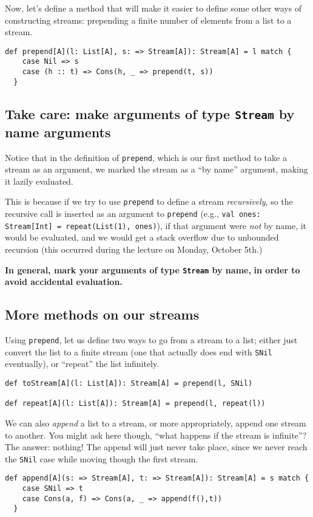 \documentclass[11pt]{article}
\begin{document}
Now, let's define a method that will make it easier
to define some other ways of constructing streams:
prepending a finite number of elements from a list
to a stream.
\begin{verbatim}
def prepend[A](l: List[A], s: => Stream[A]): Stream[A] = l match {
    case Nil => s
    case (h :: t) => Cons(h, _ => prepend(t, s))
  }
\end{verbatim}

\subsection{Take care: \textbf{make arguments of type \texttt{Stream} by name arguments}}
\label{sec:orgfa81477}
Notice that in the definition of \texttt{prepend},
which is our first method to take a stream as an argument,
we marked the stream as a “by name” argument,
making it lazily evaluated.

This is because if we try to
use \texttt{prepend} to define a stream \emph{recursively},
so the recursive call is inserted as an argument
to \texttt{prepend} (e.g., \texttt{val ones: Stream[Int] = repeat(List(1), ones)}),
if that argument were \emph{not} by name, it would be evaluated,
and we would get a stack overflow due to unbounded recursion
(this occurred during the lecture on Monday, October 5th.)

\begin{center}
\textbf{In general, mark your arguments of type \texttt{Stream} by name,}
\textbf{in order to avoid accidental evaluation.}
\end{center}

\subsection{More methods on our streams}
\label{sec:orge6d26f3}
Using \texttt{prepend}, let us define two ways
to go from a stream to a list;
either just convert the list to a finite stream
(one that actually does end with \texttt{SNil} eventually),
or “repeat” the list infinitely.
\begin{verbatim}
def toStream[A](l: List[A]): Stream[A] = prepend(l, SNil)

def repeat[A](l: List[A]): Stream[A] = prepend(l, repeat(l))
\end{verbatim}

We can also \emph{append} a list to a stream, or more appropriately,
append one stream to another.
You might ask here though,
“what happens if the stream is infinite”?
The answer: nothing! The append will just never take place,
since we never reach the \texttt{SNil} case while moving
though the first stream.
\begin{verbatim}
def append[A](s: => Stream[A], t: => Stream[A]): Stream[A] = s match {
    case SNil => t
    case Cons(a, f) => Cons(a, _ => append(f(),t))
  }
\end{verbatim}
\end{document}
